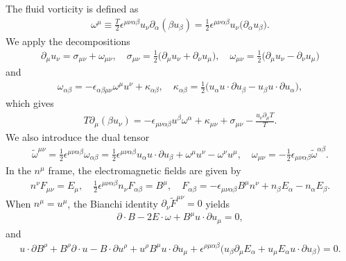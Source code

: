 \documentclass[aps,prd,showkeys,preprint,amsmath,amssymb,nofootinbib]{revtex4-1}
\begin{document}
The fluid vorticity is defined as 
\begin{eqnarray}
\omega^{\mu}\equiv\frac{T}{2}\epsilon^{\mu\nu\alpha\beta}u_{\nu}\partial_{\alpha}(\beta u_{\beta})=\frac{1}{2}\epsilon^{\mu\nu\alpha\beta}u_{\nu}\big(\partial_{\alpha}u_{\beta}\big).
\end{eqnarray}
We apply the decompositions 
\begin{eqnarray}
\partial_{\mu}u_{\nu}=\sigma_{\mu\nu}+\omega_{\mu\nu},\quad\sigma_{\mu\nu}=\frac{1}{2}\big(\partial_{\mu}u_{\nu}+\partial_{\nu}u_{\mu}\big),\quad\omega_{\mu\nu}=\frac{1}{2}\big(\partial_{\mu}u_{\nu}-\partial_{\nu}u_{\mu}\big)
\end{eqnarray}
and 
\begin{eqnarray}
\omega_{\alpha\beta}=-\epsilon_{\alpha\beta\mu\nu}\omega^{\mu}u^{\nu}+\kappa_{\alpha\beta},\quad\kappa_{\alpha\beta}=\frac{1}{2}\big(u_{\alpha}u\cdot\partial u_{\beta}-u_{\beta}u\cdot\partial u_{\alpha}\big),
\end{eqnarray}
which gives 
\begin{eqnarray}
T\partial_{\mu}(\beta u_{\nu})=-\epsilon_{\mu\nu\alpha\beta}u^{\beta}\omega^{\alpha}+\kappa_{\mu\nu}+\sigma_{\mu\nu}-\frac{u_{\nu}\partial_{\mu}T}{T}.
\end{eqnarray}
We also introduce the dual tensor 
\begin{eqnarray}
\tilde{\omega}^{\mu\nu}=\frac{1}{2}\epsilon^{\mu\nu\alpha\beta}\omega_{\alpha\beta}=\frac{1}{2}\epsilon^{\mu\nu\alpha\beta}u_{\alpha}u\cdot\partial u_{\beta}+\omega^{\mu}u^{\nu}-\omega^{\nu}u^{\mu},\quad\omega_{\mu\nu}=-\frac{1}{2}\epsilon_{\mu\nu\alpha\beta}\tilde{\omega}^{\alpha\beta}.
\end{eqnarray}
In the $n^{\mu}$ frame, the electromagnetic fields are given by 
\begin{eqnarray}
n^{\nu}F_{\mu\nu}=E_{\mu},\quad\frac{1}{2}\epsilon^{\mu\nu\alpha\beta}n_{\nu}F_{\alpha\beta}=B^{\mu},\quad F_{\alpha\beta}=-\epsilon_{\mu\nu\alpha\beta}B^{\mu}n^{\nu}+n_{\beta}E_{\alpha}-n_{\alpha}E_{\beta}.
\end{eqnarray}
When $n^{\mu}=u^{\mu}$, the Bianchi identity $\partial_{\nu}\tilde{F}^{\mu\nu}=0$
yields
\begin{eqnarray}
\partial\cdot B-2E\cdot\omega+B^{\mu}u\cdot\partial u_{\mu}=0,
\end{eqnarray}
and 
\begin{eqnarray}
u\cdot\partial B^{\rho}+B^{\rho}\partial\cdot u-B\cdot\partial u^{\rho}+u^{\rho}B^{\mu}u\cdot\partial u_{\mu}+\epsilon^{\rho\mu\alpha\beta}\big(u_{\beta}\partial_{\mu}E_{\alpha}+u_{\mu}E_{\alpha}u\cdot\partial u_{\beta}\big)=0.\label{eq:dB1}
\end{eqnarray}
\end{document}
